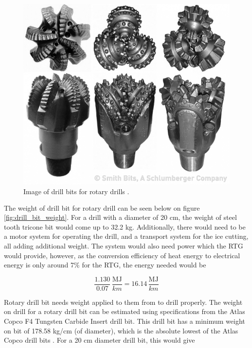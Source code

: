 \begin{figure}[htb]
\begin{center}
\includegraphics[scale=0.4]{figures/RCS/drill_bit}
\caption{Image of drill bits for rotary drills \cite{RotDrillBit}.}
\label{fig:drill_bit}
\end{center}
\end{figure}

The weight of drill bit for rotary drill can be seen below on figure \ref{fig:drill_bit_weight}. For a drill with a diameter of 20 cm, the weight of steel tooth tricone bit would come up to 32.2 kg. Additionally, there would need to be a motor system for operating the drill, and a transport system for the ice cutting, all adding additional weight. The system would also need power which the RTG would provide, however, as the conversion efficiency of heat energy to electrical energy is only around 7\% for the RTG, the energy needed would be

\begin{equation}
	\frac{1.130}{0.07} \, \frac{\mathrm{MJ}}{km} = 16.14 \, \frac{\mathrm{MJ}}{km}
\end{equation}

Rotary drill bit needs weight applied to them from to drill properly. The weight on drill for a rotary drill bit can be estimated using specifications from the Atlas Copco F4 Tungsten Carbide Insert drill bit. This drill bit has a minimum weight on bit of 178.58 kg/cm (of diameter), which is the absolute lowest of the Atlas Copco drill bits \cite{RotBit_weightOn}. For a 20 cm diameter drill bit, this would give


